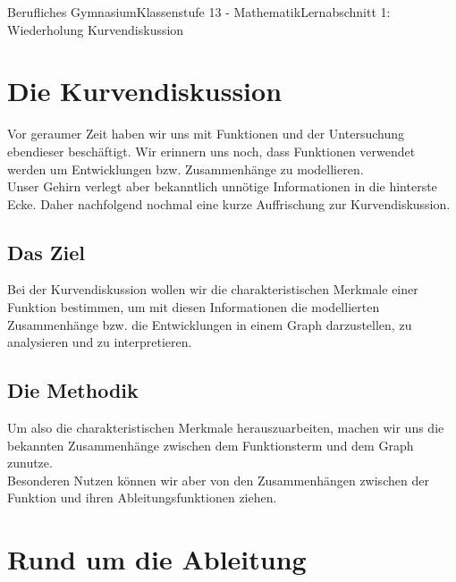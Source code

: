 \documentclass[11pt,twocolumn,oneside,openany,headings=optiontotoc,11pt,numbers=noenddot]{article}
\begin{document}
	\begin{worksheet}{Berufliches Gymnasium}{Klassenstufe 13 - Mathematik}{Lernabschnitt 1: Wiederholung Kurvendiskussion}
		\section{Die Kurvendiskussion}
		Vor geraumer Zeit haben wir uns mit Funktionen und der Untersuchung ebendieser beschäftigt. Wir erinnern uns noch, dass Funktionen verwendet werden um Entwicklungen bzw. Zusammenhänge zu modellieren.\\
		Unser Gehirn verlegt aber bekanntlich unnötige Informationen in die hinterste Ecke. Daher nachfolgend nochmal eine kurze Auffrischung zur Kurvendiskussion.
		\subsection{Das Ziel}
		Bei der Kurvendiskussion wollen wir die charakteristischen Merkmale einer Funktion bestimmen, um mit diesen Informationen die modellierten Zusammenhänge bzw. die Entwicklungen in einem Graph darzustellen, zu analysieren und zu interpretieren.
		\subsection{Die Methodik}
		Um also die charakteristischen Merkmale herauszuarbeiten, machen wir uns die bekannten Zusammenhänge zwischen dem Funktionsterm und dem Graph zunutze.\\
		Besonderen Nutzen können wir aber von den Zusammenhängen zwischen der Funktion und ihren Ableitungsfunktionen ziehen.
		\section{Rund um die Ableitung}

\end{worksheet}
\end{document}
